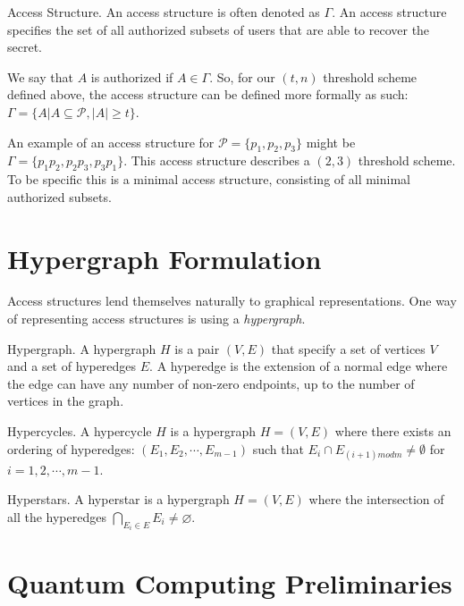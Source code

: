 \theoremstyle{definition}
\begin{definition}{Access Structure.}
    An access structure is often denoted as $\Gamma$. An access structure specifies the set of all authorized subsets of users that are able to recover the secret.
\end{definition}

 We say that $A$ is authorized if $A \in \Gamma$. So, for our $(t,n)$ threshold scheme defined above, the access structure can be defined more formally as such: $\Gamma = \{A | A \subseteq \mathcal{P} , |A| \geq t\}$.
 
 An example of an access structure for $\mathcal{P} = \{p_1,p_2,p_3\}$ might be $\Gamma = \{p_1p_2,p_2p_3,p_3p_1\}$. This access structure describes a $(2,3)$ threshold scheme. To be specific this is a minimal access structure, consisting of all minimal authorized subsets.
 
\section{Hypergraph Formulation}

Access structures lend themselves naturally to graphical representations. One way of representing access structures is using a \textit{hypergraph}.

\theoremstyle{definition}
\begin{definition}{Hypergraph.}
    A hypergraph $H$ is a pair $(V,E)$ that specify a set of vertices $V$ and a set of hyperedges $E$. A hyperedge is the extension of a normal edge where the edge can have any number of non-zero endpoints, up to the number of vertices in the graph.
\end{definition}

\theoremstyle{definition}
\begin{definition}{Hypercycles.}
    A hypercycle $H$ is a hypergraph $H = (V,E)$ where there exists an ordering of hyperedges: $(E_1, E_2, \cdots, E_{m-1})$ such that $E_{i} \cap E_{(i+1) m o d m} \neq \emptyset$ for $i = 1,2,\cdots,m-1$.
\end{definition}

\theoremstyle{definition}
\begin{definition}{Hyperstars.}
    A hyperstar is a hypergraph $H = (V,E)$ where the intersection of all the hyperedges $\bigcap_{E_{i} \in E} E_{i} \neq \varnothing$.
\end{definition}



\section{Quantum Computing Preliminaries}

